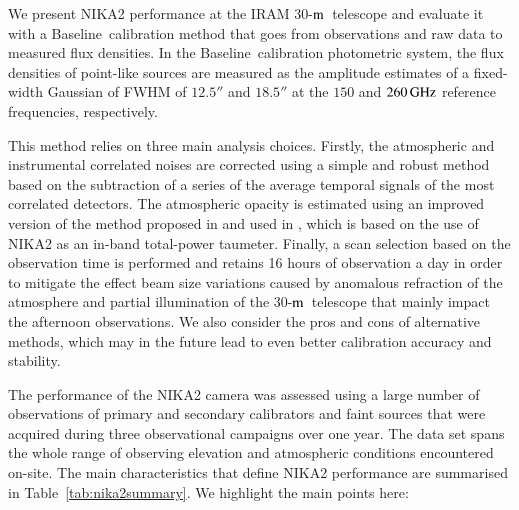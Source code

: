 \documentclass[traditionalabstract]{aa}
\newcommand{\trentemetre}{30-$\rm{m}$}
\newcommand{\baseline}{Baseline}%
\newcommand{\lp}[1]{#1}
\begin{document}
{\begin{table}[!thbp]
{  }
\end{table}

{\lp We present NIKA2 performance at the IRAM
  \trentemetre\ telescope and evaluate it with a
  \baseline\ calibration method that goes from
  observations and raw data to measured flux densities.
  In the \baseline\ calibration photometric system, the flux
  densities of point-like sources are measured as the amplitude estimates
  of a fixed-width Gaussian of FWHM of $12.5''$ and $18.5''$ at the
$150$ and $260\,\rm{GHz}$ reference frequencies, respectively.

  This method relies on three main analysis choices. Firstly, the
  atmospheric and instrumental correlated noises are corrected using a
  simple and robust method based on the subtraction of a series of
  the average temporal signals of the most correlated detectors. The
  atmospheric opacity is estimated using an improved version of 
  the method proposed in \citet{Catalano2014} and used in
  \citet{Adam2018}, which is based on the use of
  NIKA2 as an in-band total-power taumeter. Finally, a scan selection
  based on the observation time is performed and retains 16 hours
  of observation a day in order to mitigate the effect beam size
  variations caused by anomalous refraction of the atmosphere and
  partial illumination of the \trentemetre\ telescope that mainly
  impact the afternoon observations. We also consider the pros
  and cons of alternative methods, which may in the future lead to even
  better calibration accuracy and stability.}

The performance of the NIKA2 camera was assessed using a large
number of observations of primary and secondary calibrators and faint
 sources that were acquired during three
observational campaigns over one year. The data set spans the whole
range of observing
elevation and atmospheric conditions encountered on-site.
The main characteristics that define NIKA2 performance are
summarised in Table~\ref{tab:nika2summary}. We highlight the main
points here:

}
\end{document}
